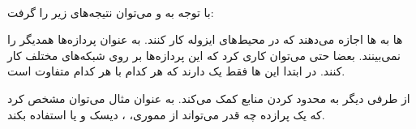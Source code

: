 \\
با توجه به
و
می‌توان نتیجه‌های زیر را گرفت:

\noindent
{}ها
به
ها
اجازه می‌دهند که در محیط‌های ایزوله کار کنند. به عنوان پردازه‌ها همدیگر را نمی‌بینند. بعضا حتی می‌توان
کاری کرد که این پردازه‌ها بر روی شبکه‌های مختلف کار کنند. در ابتدا این
ها
فقط یک
دارند که هر کدام با هر کدام متفاوت است.

\noindent
از طرفی دیگر
به محدود کردن منابع کمک می‌کند. به عنوان مثال می‌توان مشخص کرد که یک پرازده چه قدر می‌تواند از مموری،
،
دیسک و یا
استفاده بکند.


